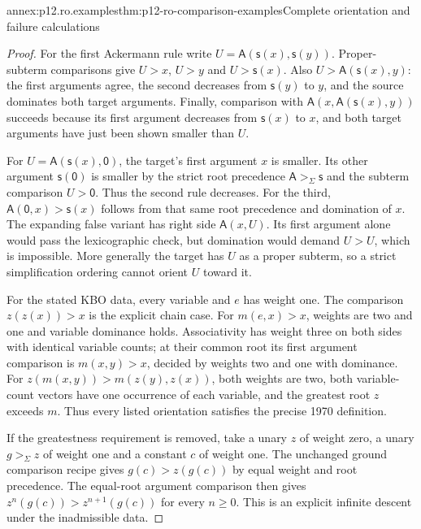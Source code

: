 \begin{annexitem}{annex:p12.ro.examples}{thm:p12-ro-comparison-examples}{Complete orientation and failure calculations}
\begin{proof}
For the first Ackermann rule write
\(U=\mathsf A(\mathsf s(x),\mathsf s(y))\).
Proper-subterm comparisons give \(U>x\), \(U>y\) and
\(U>\mathsf s(x)\). Also
\(U>\mathsf A(\mathsf s(x),y)\): the first arguments agree,
the second decreases from \(\mathsf s(y)\) to \(y\), and the
source dominates both target arguments. Finally, comparison with
\(\mathsf A(x,\mathsf A(\mathsf s(x),y))\) succeeds because
its first argument decreases from \(\mathsf s(x)\) to \(x\),
and both target arguments have just been shown smaller than \(U\).

For \(U=\mathsf A(\mathsf s(x),\mathsf0)\), the target's first
argument \(x\) is smaller. Its other argument
\(\mathsf s(\mathsf0)\) is smaller by the strict root precedence
\(\mathsf A>_\Sigma\mathsf s\) and the subterm comparison
\(U>\mathsf0\). Thus the second rule decreases. For the third,
\(\mathsf A(\mathsf0,x)>\mathsf s(x)\) follows from that same
root precedence and domination of \(x\). The expanding false
variant has right side \(\mathsf A(x,U)\). Its first argument
alone would pass the lexicographic check, but domination would demand
\(U>U\), which is impossible. More generally the target has \(U\)
as a proper subterm, so a strict simplification ordering cannot orient
\(U\) toward it.

For the stated KBO data, every variable and \(e\) has weight one.
The comparison \(z(z(x))>x\) is the explicit chain case. For
\(m(e,x)>x\), weights are two and one and variable dominance holds.
Associativity has weight three on both sides with identical variable
counts; at their common root its first argument comparison is
\(m(x,y)>x\), decided by weights two and one with dominance.
For \(z(m(x,y))>m(z(y),z(x))\), both weights are two, both
variable-count vectors have one occurrence of each variable, and
the greatest root \(z\) exceeds \(m\). Thus every listed
orientation satisfies the precise 1970 definition.

If the greatestness requirement is removed, take a unary \(z\)
of weight zero, a unary \(g>_\Sigma z\) of weight one and a
constant \(c\) of weight one. The unchanged ground comparison
recipe gives \(g(c)>z(g(c))\) by equal weight and root precedence.
The equal-root argument comparison then gives
\(z^n(g(c))>z^{n+1}(g(c))\) for every \(n\geq0\).
This is an explicit infinite descent under the inadmissible data.


\end{proof}
\end{annexitem}
